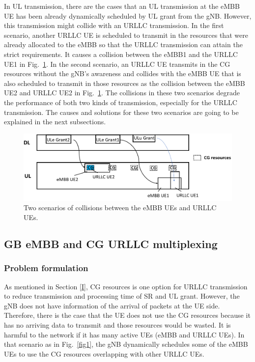 \documentclass{ieeeaccess}
\begin{document}
In UL transmission, there are the cases that an UL transmission at the eMBB UE has been already dynamically scheduled by UL grant from the gNB. However, this transmission might collide with an URLLC transmission. In the first scenario, another URLLC UE is scheduled to transmit in the resources that were already allocated to the eMBB so that the URLLC transmission can attain the strict requirements. It causes a collision between the eMBB1 and the URLLC UE1 in Fig.~\ref{fig21}. In the second scenario, an URLLC UE transmits in the CG resources without the gNB's awareness and collides with the eMBB UE that is also scheduled to transmit in those resources as the collision between the eMBB UE2 and URLLC UE2 in Fig.~\ref{fig21}. The collisions in these two scenarios degrade the performance of both two kinds of transmission, especially for the URLLC transmission. The causes and solutions for these two scenarios are going to be explained in the next subsections.

\begin{figure}[htbp]
\centerline{\includegraphics[scale=0.33]{fig21.PNG}}
\caption{Two scenarios of collisions between the eMBB UEs and URLLC UEs.}
\label{fig21}
\vspace{-5mm}
\end{figure}

\subsection{GB eMBB and CG URLLC multiplexing}\label{IIB}
\subsubsection{Problem formulation}\label{IIB1}
As mentioned in Section \ref{I}, CG resources is one option for URLLC transmission to reduce transmission and processing time of SR and UL grant. However, the gNB does not have information of the arrival of packets at the UE side. Therefore, there is the case that the UE does not use the CG resources because it has no arriving data to transmit and those resources would be wasted. It is harmful to the network if it has many active UEs (eMBB and URLLC UEs). In that scenario as in Fig.~\ref{fig1}, the gNB dynamically schedules some of the eMBB UEs to use the CG resources overlapping with other URLLC UEs.
\end{document}
